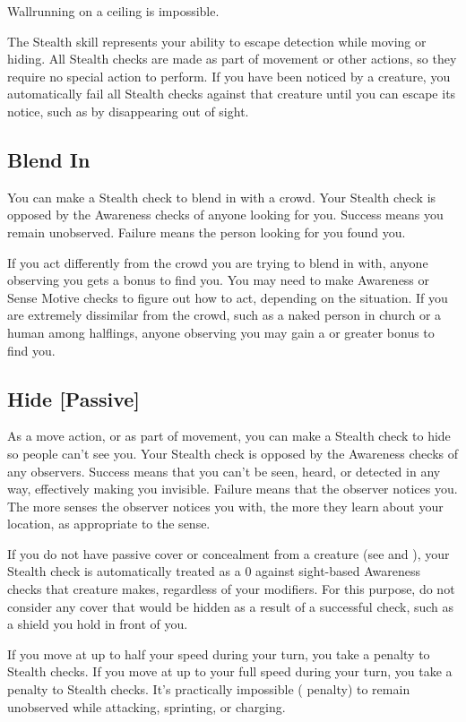         Wallrunning on a ceiling is impossible.

        The Stealth skill represents your ability to escape detection while moving or hiding. All Stealth checks are made as part of movement or other actions, so they require no special action to perform. If you have been noticed by a creature, you automatically fail all Stealth checks against that creature until you can escape its notice, such as by disappearing out of sight.

    \subsection{Blend In}
        You can make a Stealth check to blend in with a crowd. Your Stealth check is opposed by the Awareness checks of anyone looking for you. Success means you remain unobserved. Failure means the person looking for you found you.

        If you act differently from the crowd you are trying to blend in with, anyone observing you gets a  bonus to find you. You may need to make Awareness or Sense Motive checks to figure out how to act, depending on the situation. If you are extremely dissimilar from the crowd, such as a naked person in church or a human among halflings, anyone observing you may gain a  or greater bonus to find you.

    \subsection{Hide [Passive]}
        As a move action, or as part of movement, you can make a Stealth check to hide so people can't see you. Your Stealth check is opposed by the Awareness checks of any observers. Success means that you can't be seen, heard, or detected in any way, effectively making you invisible. Failure means that the observer notices you. The more senses the observer notices you with, the more they learn about your location, as appropriate to the sense.

        If you do not have passive cover or concealment from a creature (see  and ), your Stealth check is automatically treated as a 0 against sight-based Awareness checks that creature makes, regardless of your modifiers. For this purpose, do not consider any cover that would be hidden as a result of a successful check, such as a shield you hold in front of you.

        If you move at up to half your speed during your turn, you take a  penalty to Stealth checks. If you move at up to your full speed during your turn, you take a  penalty to Stealth checks. It's practically impossible ( penalty) to remain unobserved while attacking, sprinting, or charging.

